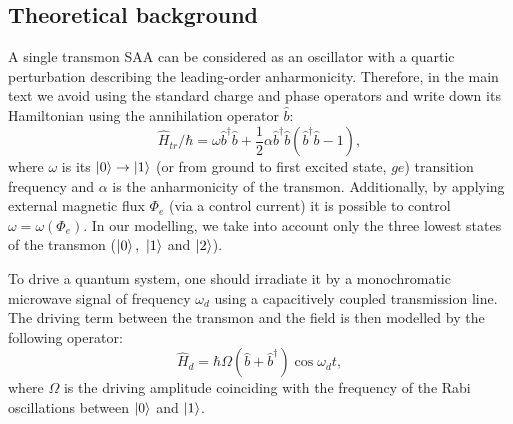 \documentclass[%
 pra,
 amsmath,amssymb,
 reprint,%
]{revtex4-1}
\begin{document}
\subsection{Theoretical background}

A single transmon SAA can be considered as an oscillator with a quartic perturbation describing the leading-order anharmonicity. Therefore, in the main text we avoid using the standard charge and phase operators and write down its Hamiltonian using the annihilation operator $\hat b$:
\begin{equation}
\hat{{H}}_{tr}/\hbar = \omega \hat b^{\dagger}\hat b +\frac{1}{2}\alpha \hat b^{\dagger}\hat b(\hat b^{\dagger}\hat b-1),
\end{equation}
where $\omega$ is its $\ket{0}\rightarrow\ket{1}$ (or from ground to first excited state, $ge$) transition frequency and $\alpha$ is the anharmonicity of the transmon. Additionally, by applying external magnetic flux $\Phi_e$ (via a control current) it is possible to control $\omega = \omega(\Phi_e)$\cite{koch2007charge}. In our modelling, we take into account only the three lowest states of the transmon ($\ket{0},\ \ket{1}$ and $\ket{2}$).

To drive a quantum system, one should irradiate it by a monochromatic microwave signal of frequency $\omega_d$ using a capacitively coupled transmission line. The driving term between the transmon and the field is then modelled by the following operator: 
\begin{equation}
\hat H_{d} = \hbar \Omega (\hat b+\hat b^{\dagger}) \cos\omega_d t,
\end{equation}
where $\Omega$ is the driving amplitude coinciding with the frequency of the Rabi oscillations between $\ket{0}$ and $\ket{1}$.
\end{document}
